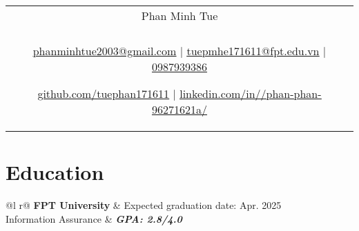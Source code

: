 \documentclass[a4paper,8pt]{article}
\begin{document}
\pagestyle{empty} 


\begin{tabularx}{\linewidth}{@{} C @{}}
\color[HTML]{1C033C} \Huge{Phan Minh Tue} \\[6pt]
\\
\textcolor[HTML]{371e77}{\underline{\href{phanminhtue2003@gmail.com}{\raisebox{-0.05\height}{\faEnvelope} phanminhtue2003@gmail.com}} $|$}
\textcolor[HTML]{371e77}{\underline{\href{tuepmhe171611@fpt.edu.vn}{\raisebox{-0.05\height}{\faEnvelope} tuepmhe171611@fpt.edu.vn}} $|$}
\textcolor[HTML]{371e77}{\href{tel:0987939386}{\raisebox{-0.05\height}{\faMobile} 0987939386}}

\textcolor[HTML]{371e77}{\underline{\href{https://github.com/tuephan171611}{\raisebox{-0.05\height}{\faGithub} github.com/tuephan171611}} $|$}
\textcolor[HTML]{371e77}{\underline{\href{https://linkedin.com/in//phan-phan-96271621a/}{\raisebox{-0.05\height}{\faLinkedin} linkedin.com/in//phan-phan-96271621a/}}}
\end{tabularx}

\section{Education}
\begin{tabularx}{\linewidth}{ @{}l r@{} }
\color[HTML]{1C033C} \textbf{FPT University} & \hfill \color[HTML]{371e77} Expected graduation date: Apr. 2025 \\
\color[HTML]{371e77} Information Assurance & \hfill \color[HTML]{4B28A4} \textit{\textbf{GPA: 2.8/4.0}} \\
\end{tabularx}


\end{document}
